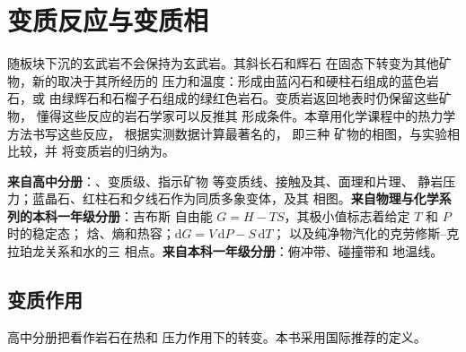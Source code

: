 \chapter{变质反应与变质相}\label{ch:b2:metamorphic-facies}

随板块下沉的玄武岩不会保持为玄武岩。其斜长石和辉石
在固态下转变为其他矿物，新的取决于其所经历的
压力和温度：形成由蓝闪石和硬柱石组成的蓝色岩石，或
由绿辉石和石榴子石组成的绿红色岩石。变质岩返回地表时仍保留这些矿物，
懂得这些反应的岩石学家可以反推其
形成条件。本章用化学课程中的热力学方法书写这些反应，
根据实测数据计算最著名的，
即三种  矿物的相图，与实验相比较，并
将变质岩的归纳为。

\begin{recall}
\textbf{来自高中分册}：、变质级、指示矿物
等变质线、接触及其、面理和片理、
静岩压力；蓝晶石、红柱石和夕线石作为同质多象变体，及其
相图。\textbf{来自物理与化学系列的本科一年级分册}：吉布斯
自由能 $G = H - TS$，其极小值标志着给定 $T$ 和 $P$ 时的稳定态；
焓、熵和热容；$\mathrm dG = V\,\mathrm dP - S\,\mathrm dT$；
以及纯净物汽化的克劳修斯–克拉珀龙关系和水的三
相点。\textbf{来自本科一年级分册}：俯冲带、碰撞带和
地温线。
\end{recall}

\section{变质作用}\label{sec:b2:metamorphic-facies:metamorphism}

高中分册把看作岩石在热和
压力作用下的转变。本书采用国际推荐的定义。

